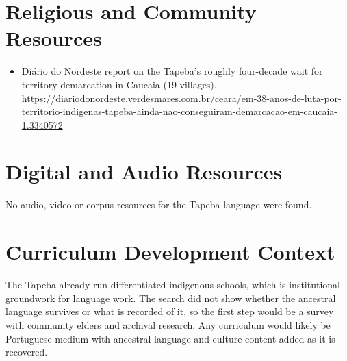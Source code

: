 \documentclass[12pt]{article}
\begin{document}
\section{Religious and Community Resources}
\begin{itemize}
\item Di\'ario do Nordeste report on the Tapeba's roughly four-decade wait for territory demarcation in Caucaia (19 villages). \url{https://diariodonordeste.verdesmares.com.br/ceara/em-38-anos-de-luta-por-territorio-indigenas-tapeba-ainda-nao-conseguiram-demarcacao-em-caucaia-1.3340572}
\end{itemize}

\section{Digital and Audio Resources}
No audio, video or corpus resources for the Tapeba language were found.

\section{Curriculum Development Context}
The Tapeba already run differentiated indigenous schools, which is institutional groundwork for language work. The search did not show whether the ancestral language survives or what is recorded of it, so the first step would be a survey with community elders and archival research. Any curriculum would likely be Portuguese-medium with ancestral-language and culture content added as it is recovered.
\end{document}

